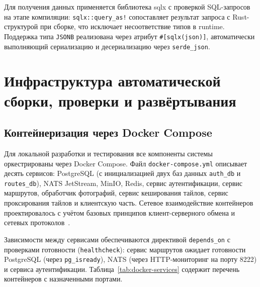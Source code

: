 Для получения данных применяется библиотека sqlx с проверкой SQL-запросов на этапе компиляции: \texttt{sqlx::query\_as!} сопоставляет результат запроса с Rust-структурой при сборке, что исключает несоответствие типов в runtime. Поддержка типа \texttt{JSONB} реализована через атрибут \texttt{\#[sqlx(json)]}, автоматически выполняющий сериализацию и десериализацию через \texttt{serde\_json}.

\section{Инфраструктура автоматической сборки, проверки и развёртывания}
\label{sec:infra-implementation}

\subsection{Контейнеризация через Docker Compose}

Для локальной разработки и тестирования все компоненты системы оркестрированы через Docker Compose. Файл \texttt{docker-compose.yml} описывает десять сервисов: PostgreSQL (с инициализацией двух баз данных \texttt{auth\_db} и \texttt{routes\_db}), NATS JetStream, MinIO, Redis, сервис аутентификации, сервис маршрутов, обработчик фотографий, сервис кеширования тайлов, сервис проксирования тайлов и клиентскую часть. Сетевое взаимодействие контейнеров проектировалось с учётом базовых принципов клиент-серверного обмена и сетевых протоколов~\cite{tanenbaum2012}.

Зависимости между сервисами обеспечиваются директивой \texttt{depends\_on} с проверками готовности (\texttt{healthcheck}): сервис маршрутов ожидает готовности PostgreSQL (через \texttt{pg\_isready}), NATS (через HTTP-мониторинг на порту 8222) и сервиса аутентификации. Таблица~\ref{tab:docker-services} содержит перечень контейнеров с назначенными портами.

